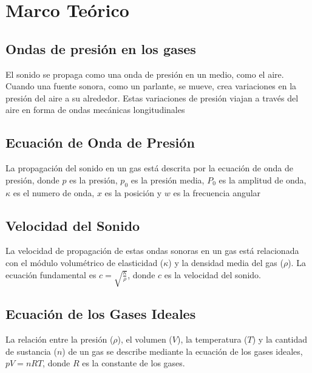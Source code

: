 \documentclass[twocolumn, 12pt]{article}
\begin{document}
\section{Marco Teórico}

\subsection{Ondas de presión en los gases}

El sonido se propaga como una onda de presión en un medio,
como el aire. Cuando una fuente sonora, como un parlante,
se mueve, crea variaciones en la presión del aire a su
alrededor. Estas variaciones de presión viajan a través del
aire en forma de ondas mecánicas longitudinales

\subsection{Ecuación de Onda de Presión}

La propagación del sonido en un gas está descrita por la
ecuación de onda de presión, donde $p$ es la presión, $p_0$
es la presión media, $P_0$ es la amplitud de onda, $\kappa$
es el numero de onda, $x$ es la posición y $w$ es la
frecuencia angular

\subsection{Velocidad del Sonido}

La velocidad de propagación de estas ondas sonoras en un
gas está relacionada con el módulo volumétrico de
elasticidad ($\kappa$) y la densidad media del gas
($\rho$). La ecuación fundamental es $c =
    \sqrt{\frac{\kappa}{\rho}}$, donde $c$ es la velocidad del
sonido.

\subsection{Ecuación de los Gases Ideales}

La relación entre la presión ($\rho$), el volumen ($V$), la
temperatura ($T$) y la cantidad de sustancia ($n$) de un
gas se describe mediante la ecuación de los gases ideales,
$pV = nRT$, donde $R$ es la constante de los gases.
\end{document}
